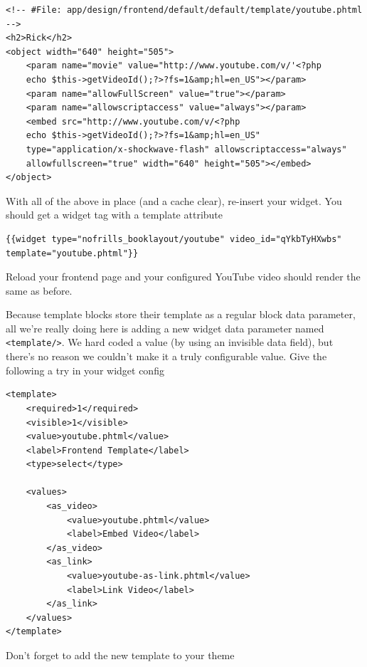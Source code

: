 \documentclass[oneside]{book}
\begin{document}
\begin{lstlisting}
<!-- #File: app/design/frontend/default/default/template/youtube.phtml -->
<h2>Rick</h2>
<object width="640" height="505">
    <param name="movie" value="http://www.youtube.com/v/'<?php
    echo $this->getVideoId();?>?fs=1&amp;hl=en_US"></param>
    <param name="allowFullScreen" value="true"></param>
    <param name="allowscriptaccess" value="always"></param>
    <embed src="http://www.youtube.com/v/<?php
    echo $this->getVideoId();?>?fs=1&amp;hl=en_US"
    type="application/x-shockwave-flash" allowscriptaccess="always"
    allowfullscreen="true" width="640" height="505"></embed>
</object>

\end{lstlisting}


With all of the above in place (and a cache clear), re-insert your widget.  You should get a widget tag with a template attribute

\begin{lstlisting}
{{widget type="nofrills_booklayout/youtube" video_id="qYkbTyHXwbs"
template="youtube.phtml"}}

\end{lstlisting}


Reload your frontend page and your configured YouTube video should render the same as before.

Because template blocks store their template as a regular block data parameter, all we're really doing here is adding a new widget data parameter named \footnotesize\texttt{\textless template/\textgreater }\normalsize.  We hard coded a value (by using an invisible data field), but there's no reason we couldn't make it a truly configurable value.  Give the following a try in your widget config

\begin{lstlisting}
<template>
    <required>1</required>
    <visible>1</visible>
    <value>youtube.phtml</value>
    <label>Frontend Template</label>
    <type>select</type>

    <values>
        <as_video>
            <value>youtube.phtml</value>
            <label>Embed Video</label>
        </as_video>
        <as_link>
            <value>youtube-as-link.phtml</value>
            <label>Link Video</label>
        </as_link>
    </values>
</template>

\end{lstlisting}


Don't forget to add the new template to your theme
\end{document}
